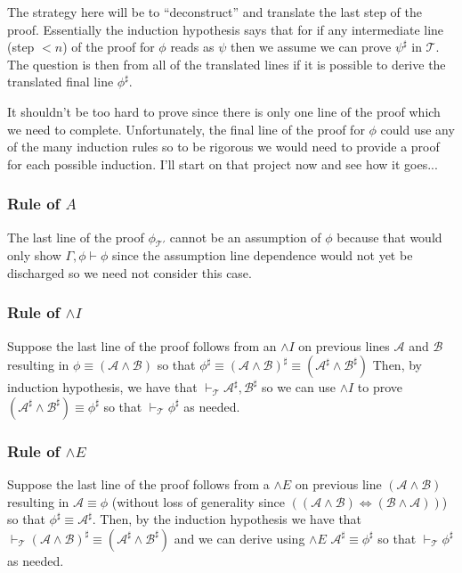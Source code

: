 \documentclass[12pt]{article}
\newcommand{\bv}[1]{\boldsymbol{#1}}
\newcommand{\mc}[1]{\mathcal{#1}}
\newcommand{\bc}[1]{\bv{\mc{#1}}}
\begin{document}
The strategy here will be to ``deconstruct'' and translate the last step of the proof. Essentially the induction hypothesis says that for if any intermediate line (step $<n$) of the proof for $\phi$ reads as $\psi$ then we assume we can prove $\psi^{\sharp}$ in $\bc{T}$. The question is then from all of the translated lines if it is possible to derive the translated final line $\phi^{\sharp}$.

It shouldn't be too hard to prove since there is only one line of the proof which we need to complete. Unfortunately, the final line of the proof for $\phi$ could use any of the many induction rules so to be rigorous we would need to provide a proof for each possible induction. I'll start on that project now and see how it goes...

\hrulefill
\subsubsection{Rule of $A$}
The last line of the proof $\phi_{\bc{T}'}$ cannot be an assumption of $\phi$ because that would only show $\Gamma,\phi \vdash \phi$ since the assumption line dependence would not yet be discharged so we need not consider this case.

\hrulefill

\subsubsection*{Rule of $\land I$}
Suppose the last line of the proof follows from an $\land I$ on previous lines $\mc{A}$ and $\mc{B}$ resulting in $\phi \equiv (\mc{A} \land \mc{B})$ so that $\phi^{\sharp} \equiv (\mc{A} \land \mc{B})^{\sharp} \equiv (\mc{A}^{\sharp}\land \mc{B}^{\sharp})$ Then, by induction hypothesis, we have that $\vdash_{\bc{T}} \mc{A}^{\sharp}, \mc{B}^{\sharp}$ so we can use $\land I$ to prove $(\mc{A}^{\sharp} \land \mc{B}^{\sharp}) \equiv \phi^{\sharp}$ so that $\vdash_{\bc{T}} \phi^{\sharp}$ as needed.

\hrulefill

\subsubsection*{Rule of $\land E$}
Suppose the last line of the proof follows from a $\land E$ on previous line $(\mc{A} \land \mc{B})$ resulting in $\mc{A}\equiv\phi$ (without loss of generality since $((\mc{A} \land \mc{B}) \iff (\mc{B} \land \mc{A}))$) so that $\phi^{\sharp} \equiv \mc{A}^{\sharp}$. Then, by the induction hypothesis we have that $\vdash_{\bc{T}}(\mc{A}\land\mc{B})^{\sharp}\equiv (\mc{A}^{\sharp} \land \mc{B}^{\sharp})$ and we can derive using $\land E$ $\mc{A}^{\sharp} \equiv \phi^{\sharp}$ so that $\vdash_{\bc{T}} \phi^{\sharp}$ as needed.
\end{document}
